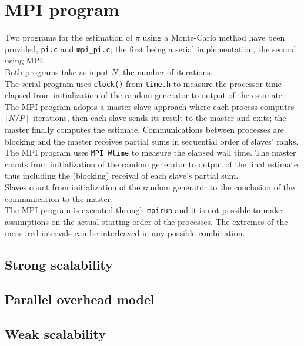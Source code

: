 \documentclass[a4paper, 11pt, twoside, openright]{article}
\DeclarePairedDelimiter{\floor}{\lfloor}{\rfloor}
\begin{document}
\section{MPI program}
Two programs for the estimation of $\pi$ using a Monte-Carlo method have been provided, \texttt{pi.c} and \texttt{mpi\_pi.c}; the first being a serial implementation, the second using MPI.\\
Both programs take as input $N$, the number of iterations.\\
The serial program uses \texttt{clock()} from \texttt{time.h} to measure the processor time elapsed from initialization of the random generator to output of the estimate.\\
The MPI program adopts a master-slave approach where each process computes $\floor{N/P}$ iterations, then each slave sends its result to the master and exits; the master finally computes the estimate. Communications between processes are blocking and the master receives partial sums in sequential order of slaves' ranks.\\
The MPI program uses \texttt{MPI\_Wtime} to measure the elapsed wall time. The master counts from initialization of the random generator to output of the final estimate, thus including the (blocking) receival of each slave's partial sum.\\
Slaves count from initialization of the random generator to the conclusion of the communication to the master.\\
The MPI program is executed through \texttt{mpirun} and it is not possible to make assumptions on the actual starting order of the processes. The extremes of the measured intervals can be interleaved in any possible combination.
\subsection{Strong scalability}

\subsection{Parallel overhead model}

\subsection{Weak scalability}
\end{document}
